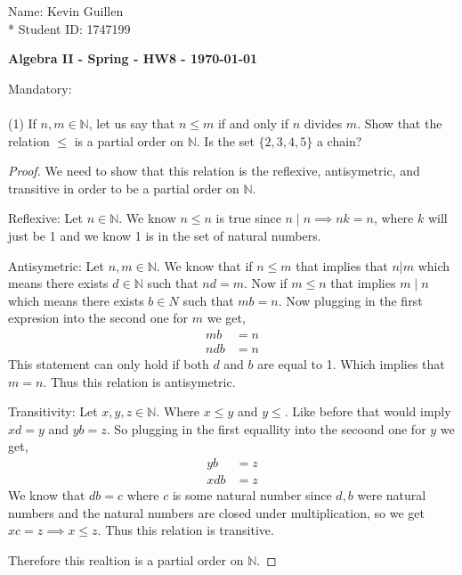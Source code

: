 \documentclass[12pt]{article}
\newcommand      {\N}         {{\mathbb N}}
\begin{document}
\begin{flushright}
    Name: Kevin Guillen \\*
    Student ID: 1747199
\end{flushright}
\begin{center}
    {\bf Algebra II - Spring - HW8 - \today}
\end{center}

\noindent Mandatory:\\
\\
(1) If $n,m\in\N$, let us say that $n\leq m$ if and only if $n$ divides $m$. Show that the relation $\leq$ is a partial order on $\N$. Is the set $\{2,3,4,5\}$ a chain?\\
\begin{proof}
	We need to show that this relation is the reflexive, antisymetric, and transitive in order to be a partial order on $\N$.

	Reflexive: Let $n \in \N$. We know $n\leq n$ is true since $n\mid n \implies nk = n$, where $k$ will just be 1 and we know 1 is in the set of natural numbers.

	Antisymetric: Let $n,m\in \N$. We know that if $n\leq m$ that implies that $n|m$ which means there exists $d\in \N$ such that $nd = m$. Now if $m \leq n$ that implies $m\mid n$ which means there exists $b\in N$ such that $mb = n$. Now plugging in the first expresion into the second one for $m$ we get,
	\begin{align*}
		mb &= n \\
		ndb &= n
	\end{align*}
	This statement can only hold if both $d$ and $b$ are equal to 1. Which implies that $m = n$. Thus this relation is antisymetric. 

	Transitivity: Let $x,y,z \in \N$. Where $x\leq y$ and $y\leq$. Like before that would imply $xd = y$ and $yb = z$. So plugging in the first equallity into the secoond one for $y$ we get,
	\begin{align*}
		yb &=z \\
		xdb &= z
	\end{align*}
	We know that $db = c$ where $c$ is some natural number since $d,b$ were natural numbers and the natural numbers are closed under multiplication, so we get $xc = z \implies x \leq z$. Thus this relation is transitive.

	Therefore this realtion is a partial order on $\N$.
\end{proof}
\end{document}
